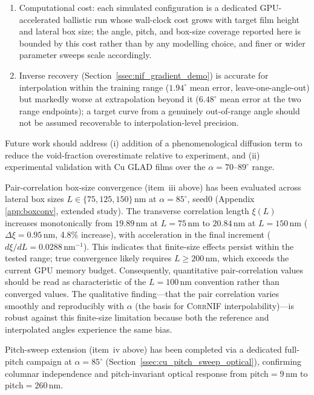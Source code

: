 \documentclass[aip,amsmath,amssymb,reprint]{revtex4-1}
\newcommand{\dang}{\ensuremath{\alpha}}
\begin{document}
\begin{enumerate}
    the exact magnitude of the angular trend remain provisional pending an
    angle-resolved, full-height convergence study (future work).
  \item Computational cost: each simulated configuration is a dedicated
    GPU-accelerated ballistic run whose wall-clock cost grows with target
    film height and lateral box size; the angle, pitch, and box-size
    coverage reported here is bounded by this cost rather than by any
    modelling choice, and finer or wider parameter sweeps scale
    accordingly.
  \item Inverse recovery (Section~\ref{ssec:nif_gradient_demo}) is
    accurate for interpolation within the training range ($1.94^{\circ}$
    mean error, leave-one-angle-out) but markedly worse at extrapolation
    beyond it ($6.48^{\circ}$ mean error at the two range endpoints); a
    target curve from a genuinely out-of-range angle should not be assumed
    recoverable to interpolation-level precision.
\end{enumerate}

Future work should address (i) addition of a phenomenological diffusion
term to reduce the void-fraction overestimate relative to experiment,
and (ii) experimental validation with Cu GLAD films over the
$\dang = 70$--$89^{\circ}$ range.

Pair-correlation box-size convergence (item~iii above) has been evaluated
across lateral box sizes $L \in \{75, 125, 150\}\,\mathrm{nm}$ at
$\dang=85^{\circ}$, seed0 (Appendix \ref{app:boxconv}, extended study).
The transverse correlation length $\xi(L)$ increases monotonically from
$19.89\,\mathrm{nm}$ at $L=75\,\mathrm{nm}$ to $20.84\,\mathrm{nm}$ at
$L=150\,\mathrm{nm}$ ($\Delta \xi = 0.95\,\mathrm{nm}$, 4.8\% increase),
with acceleration in the final increment ($d\xi/dL = 0.0288\,\mathrm{nm}^{-1}$).
This indicates that finite-size effects persist within the tested range;
true convergence likely requires $L \geq 200\,\mathrm{nm}$, which exceeds
the current GPU memory budget. Consequently, quantitative pair-correlation
values should be read as characteristic of the $L=100\,\mathrm{nm}$ convention
rather than converged values. The qualitative finding---that the pair
correlation varies smoothly and reproducibly with $\dang$ (the basis for
\textsc{CorrNIF} interpolability)---is robust against this finite-size limitation
because both the reference and interpolated angles experience the same bias.

Pitch-sweep extension (item~iv above) has been completed via a dedicated
full-pitch campaign at $\dang=85^{\circ}$ (Section~\ref{ssec:cu_pitch_sweep_optical}),
confirming columnar independence and pitch-invariant optical response from
pitch$=9\,\mathrm{nm}$ to pitch$=260\,\mathrm{nm}$.
\end{document}
